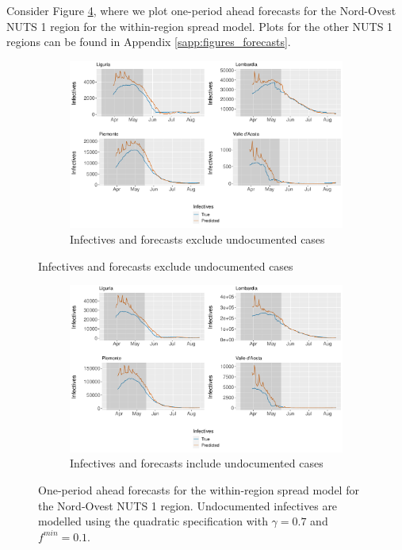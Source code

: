 \documentclass[12pt]{article}
\begin{document}
	Consider Figure \ref{fig:forecast_within_nordovest}, where we plot one-period ahead forecasts for the Nord-Ovest NUTS 1 region for the within-region spread model. Plots for the other NUTS 1 regions can be found in Appendix \ref{sapp:figures_forecasts}.
	
	\begin{figure}[H]
	    \centering
	    \begin{subfigure}{\textwidth}
	      \centering
	      \includegraphics[width=0.94\linewidth]{output/model_within_lag14_forecast_start20_Nord-Ovest_rolling.pdf}
	      \caption{Infectives and forecasts exclude undocumented cases}
	      \label{fig:forecast_within_nordovest_regular}
	    \end{subfigure}
    \end{figure}
    \begin{figure}[H]\ContinuedFloat
	    \begin{subfigure}{\textwidth}
	      \centering
	      \includegraphics[width=0.94\linewidth]{output/model_within_lag14_forecast_start20_Nord-Ovest_UndocQuadratic_rolling.pdf}
	      \caption{Infectives and forecasts include undocumented cases}
	      \label{fig:forecast_within_nordovest_undoc}
	    \end{subfigure}
	    \caption{One-period ahead forecasts for the within-region spread model for the Nord-Ovest NUTS 1 region. Undocumented infectives are modelled using the quadratic specification with $\gamma = 0.7$ and $f^{min}=0.1$.}
	    \label{fig:forecast_within_nordovest}
    \end{figure}
	
\end{document}

